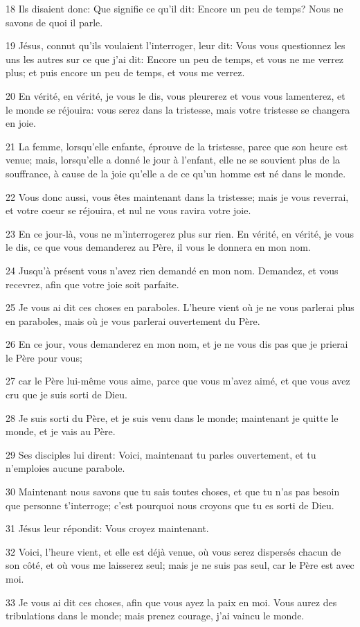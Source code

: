 \par 18 Ils disaient donc: Que signifie ce qu'il dit: Encore un peu de temps? Nous ne savons de quoi il parle.
\par 19 Jésus, connut qu'ils voulaient l'interroger, leur dit: Vous vous questionnez les uns les autres sur ce que j'ai dit: Encore un peu de temps, et vous ne me verrez plus; et puis encore un peu de temps, et vous me verrez.
\par 20 En vérité, en vérité, je vous le dis, vous pleurerez et vous vous lamenterez, et le monde se réjouira: vous serez dans la tristesse, mais votre tristesse se changera en joie.
\par 21 La femme, lorsqu'elle enfante, éprouve de la tristesse, parce que son heure est venue; mais, lorsqu'elle a donné le jour à l'enfant, elle ne se souvient plus de la souffrance, à cause de la joie qu'elle a de ce qu'un homme est né dans le monde.
\par 22 Vous donc aussi, vous êtes maintenant dans la tristesse; mais je vous reverrai, et votre coeur se réjouira, et nul ne vous ravira votre joie.
\par 23 En ce jour-là, vous ne m'interrogerez plus sur rien. En vérité, en vérité, je vous le dis, ce que vous demanderez au Père, il vous le donnera en mon nom.
\par 24 Jusqu'à présent vous n'avez rien demandé en mon nom. Demandez, et vous recevrez, afin que votre joie soit parfaite.
\par 25 Je vous ai dit ces choses en paraboles. L'heure vient où je ne vous parlerai plus en paraboles, mais où je vous parlerai ouvertement du Père.
\par 26 En ce jour, vous demanderez en mon nom, et je ne vous dis pas que je prierai le Père pour vous;
\par 27 car le Père lui-même vous aime, parce que vous m'avez aimé, et que vous avez cru que je suis sorti de Dieu.
\par 28 Je suis sorti du Père, et je suis venu dans le monde; maintenant je quitte le monde, et je vais au Père.
\par 29 Ses disciples lui dirent: Voici, maintenant tu parles ouvertement, et tu n'emploies aucune parabole.
\par 30 Maintenant nous savons que tu sais toutes choses, et que tu n'as pas besoin que personne t'interroge; c'est pourquoi nous croyons que tu es sorti de Dieu.
\par 31 Jésus leur répondit: Vous croyez maintenant.
\par 32 Voici, l'heure vient, et elle est déjà venue, où vous serez dispersés chacun de son côté, et où vous me laisserez seul; mais je ne suis pas seul, car le Père est avec moi.
\par 33 Je vous ai dit ces choses, afin que vous ayez la paix en moi. Vous aurez des tribulations dans le monde; mais prenez courage, j'ai vaincu le monde.

